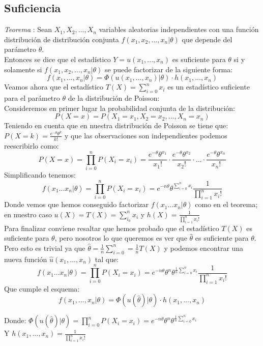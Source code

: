 \documentclass[a4paper, 10pt]{article} %
\newcounter{teo}
\begin{document}
\subsection{Suficiencia}
\addtocounter{teo}{1}
\emph{Teorema }: Sean $X_1, X_2, ..., X_n$ variables aleatorias independientes con una función distribución de distribución conjunta $f(x_1, x_2, ..., x_n | \theta)$ que depende del parámetro $\theta$. \\
Entonces se dice que el estadístico $Y = u(x_1, ..., x_n)$ es suficiente para $\theta$ si y solamente si $f(x_1, x_2, ..., x_n | \theta)$ se puede factorizar de la siguiente forma: \\
$$ f(x_1,...,x_n| \theta) = \Phi(u(x_1, ..., x_n) | \theta)\cdot h(x_1, ..., x_n) $$
Veamos ahora que el estadístico \(T(X) = \sum_{i=0}^n x_i\) es un estadístico suficiente para el parámetro $\theta$ de la distribución de Poisson: \\
Consideremos en primer lugar la probabilidad conjunta de la distribución:
$$P(X=x) = P(X_1 = x_1, X_2 = x_2, ..., X_n = x_n) $$
Teniendo en cuenta que en nuestra distribución de Poisson se tiene que: \(P(X=k) = \frac{e^{-\theta }\theta ^{k}}{k!}\) y que las observaciones son independientes podemos reescribirlo como:
$$P(X=x) = \prod_{i=0}^nP(X_i = x_i) = \frac{e^{-\theta }\theta ^{x_1}}{x_1!}\cdot \frac{e^{-\theta }\theta ^{x_2}}{x_2!}\cdot ... \cdot \frac{e^{-\theta }\theta ^{x_n}}{x_n!}$$
Simplificando tenemos:
$$f(x_1...x_n | \theta) = \prod_{i=0}^nP(X_i = x_i) = e^{-n\theta }\theta ^{\sum_{i=0}^nx_i} \frac{1}{\prod_{i=1}^nx_i!}$$
Donde vemos que hemos conseguido factorizar $f(x_1...x_n | \theta)$ como en el teorema; en nuestro caso $u(X) = T(X) = \sum_{i_0}^n x_i$ y $h(X) =  \frac{1}{\prod_{i=1}^nx_i!}$\\
Para finalizar conviene resaltar que hemos probado que el estadístico $T(X)$ es suficiente para $\theta$, pero nosotros lo que queremos es ver que $\hat{\theta}$ es suficiente para $\theta$.\\
Pero esto es trivial ya que $\hat{\theta} = \frac{1}{n}\sum_{i=0}^n = \frac{1}{n}T(X)$ y podemos encontrar una nueva función $\hat u(x_1,...,x_n)$ tal que:
$$f(x_1...x_n | \theta) = \prod_{i=0}^nP(X_i = x_i) = e^{-n\theta }\theta ^{n}\theta ^{\frac{1}{n}{\sum_{i=0}^nx_i}} \frac{1}{\prod_{i=1}^nx_i!}$$ 
Que cumple el esquema: \\
$$ f(x_1,...,x_n| \theta) = \Phi(u(\hat\theta) | \theta)\cdot h(x_1, ..., x_n) $$

Donde: $\Phi(u(\hat\theta) | \theta) = \prod_{i=0}^nP(X_i = x_i) = e^{-n\theta }\theta ^{n}\theta ^{\frac{1}{n}{\sum_{i=0}^nx_i}}$ \\
Y $h(x_1, ..., x_n) = \frac{1}{\prod_{i=1}^nx_i!}$
\end{document}
